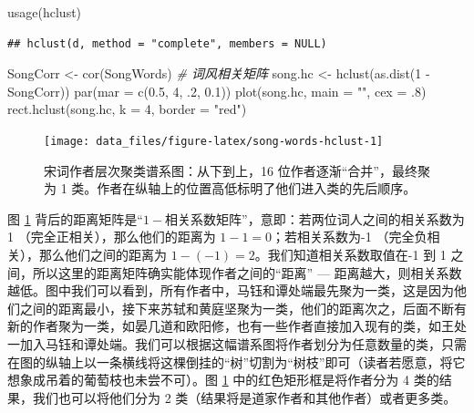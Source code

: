 \documentclass[
  b5paper,
  UTF8,twoside]{book}
\newenvironment{Shaded}{\begin{snugshade}}{\end{snugshade}}
\newcommand{\AttributeTok}[1]{\textcolor[rgb]{0.77,0.63,0.00}{#1}}
\newcommand{\CommentTok}[1]{\textcolor[rgb]{0.56,0.35,0.01}{\textit{#1}}}
\newcommand{\DecValTok}[1]{\textcolor[rgb]{0.00,0.00,0.81}{#1}}
\newcommand{\FloatTok}[1]{\textcolor[rgb]{0.00,0.00,0.81}{#1}}
\newcommand{\FunctionTok}[1]{\textcolor[rgb]{0.00,0.00,0.00}{#1}}
\newcommand{\NormalTok}[1]{#1}
\newcommand{\OtherTok}[1]{\textcolor[rgb]{0.56,0.35,0.01}{#1}}
\newcommand{\SpecialCharTok}[1]{\textcolor[rgb]{0.00,0.00,0.00}{#1}}
\newcommand{\StringTok}[1]{\textcolor[rgb]{0.31,0.60,0.02}{#1}}
\begin{document}
\begin{Shaded}
\begin{Highlighting}[]
\FunctionTok{usage}\NormalTok{(hclust)}
\end{Highlighting}
\end{Shaded}

\begin{verbatim}
## hclust(d, method = "complete", members = NULL)
\end{verbatim}

\begin{Shaded}
\begin{Highlighting}[]
\NormalTok{SongCorr }\OtherTok{\textless{}{-}} \FunctionTok{cor}\NormalTok{(SongWords) }\CommentTok{\# 词风相关矩阵}
\NormalTok{song.hc }\OtherTok{\textless{}{-}} \FunctionTok{hclust}\NormalTok{(}\FunctionTok{as.dist}\NormalTok{(}\DecValTok{1} \SpecialCharTok{{-}}\NormalTok{ SongCorr))}
\FunctionTok{par}\NormalTok{(}\AttributeTok{mar =} \FunctionTok{c}\NormalTok{(}\FloatTok{0.5}\NormalTok{, }\DecValTok{4}\NormalTok{, .}\DecValTok{2}\NormalTok{, }\FloatTok{0.1}\NormalTok{))}
\FunctionTok{plot}\NormalTok{(song.hc, }\AttributeTok{main =} \StringTok{""}\NormalTok{, }\AttributeTok{cex =}\NormalTok{ .}\DecValTok{8}\NormalTok{)}
\FunctionTok{rect.hclust}\NormalTok{(song.hc, }\AttributeTok{k =} \DecValTok{4}\NormalTok{, }\AttributeTok{border =} \StringTok{"red"}\NormalTok{)}
\end{Highlighting}
\end{Shaded}

\begin{figure}

{\centering \texttt{[image: data\_files/figure-latex/song-words-hclust-1]} 

}

\caption[宋词作者层次聚类谱系图]{宋词作者层次聚类谱系图：从下到上，16 位作者逐渐``合并''，最终聚为 1 类。作者在纵轴上的位置高低标明了他们进入类的先后顺序。}\label{fig:song-words-hclust}
\end{figure}



图 \ref{fig:song-words-hclust} 背后的距离矩阵是``\(1-\text{相关系数矩阵}\)''，意即：若两位词人之间的相关系数为 1 （完全正相关），那么他们的距离为 \(1-1=0\)；若相关系数为-1 （完全负相关），那么他们之间的距离为 \(1-(-1)=2\)。我们知道相关系数取值在-1 到 1 之间，所以这里的距离矩阵确实能体现作者之间的``距离'' --- 距离越大，则相关系数越低。图中我们可以看到，所有作者中，马钰和谭处端最先聚为一类，这是因为他们之间的距离最小，接下来苏轼和黄庭坚聚为一类，他们的距离次之，后面不断有新的作者聚为一类，如晏几道和欧阳修，也有一些作者直接加入现有的类，如王处一加入马钰和谭处端。我们可以根据这幅谱系图将作者划分为任意数量的类，只需在图的纵轴上以一条横线将这棵倒挂的``树''切割为``树枝''即可（读者若愿意，将它想象成吊着的葡萄枝也未尝不可）。图 \ref{fig:song-words-hclust} 中的红色矩形框是将作者分为 4 类的结果，我们也可以将他们分为 2 类（结果将是道家作者和其他作者）或者更多类。
\end{document}
